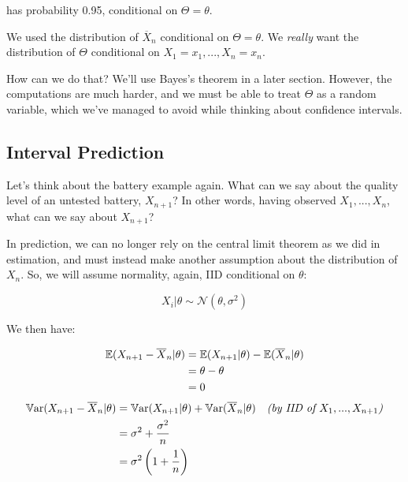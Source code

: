\documentclass[a4paper]{article}
\begin{document}
                has probability 0.95, conditional on $\Theta = \theta$.

                We used the distribution of $\overline X_n$ conditional on
                $\Theta = \theta$. We \textit{really} want the distribution of
                $\Theta$ conditional on $X_1 = x_1, ..., X_n = x_n$.

                How can we do that? We'll use Bayes's theorem in a later section.
                However, the computations are much harder, and we must be able
                to treat $\Theta$ as a random variable, which we've managed to
                avoid while thinking about confidence intervals.

        \subsection{Interval Prediction}
            \begin{fread}
                [MR03, section 8.6]
            \end{fread}

            Let's think about the battery example again. What can we say about
            the quality level of an untested battery, $X_{n+1}$? In other words,
            having observed $X_1, ..., X_n$, what can we say about $X_{n+1}$?

            In prediction, we can no longer rely on the central limit theorem as
            we did in estimation, and must instead make another assumption about
            the distribution of $X_n$. So, we will assume normality, again, IID
            conditional on $\theta$:

            \[
                X_i | \theta \sim \mathcal{N}(\theta, \sigma^2)
            \]

            We then have:

            \begin{align*}
                \mathbb{E}(X_{n + 1} - \overline X_n | \theta) & = \mathbb{E}(X_{n + 1} |
                    \theta) - \mathbb{E}(\overline X_n | \theta) \\
                & = \theta - \theta \\
                & = 0
            \end{align*}
            \begin{align*}
                \mathbb{V}\text{ar}(X_{n + 1} - \overline X_n | \theta) & = \mathbb{V}\text{ar}(X_{n + 1} |
                    \theta) + \mathbb{V}\text{ar}(\overline X_n | \theta) & \textit{(by IID of
                    $X_1, ..., X_{n+1}$)} \\
                & = \sigma^2 + \frac{\sigma^2}{n} \\
                & = \sigma^2 \left(1 + \frac{1}{n}\right)
            \end{align*}
\end{document}
